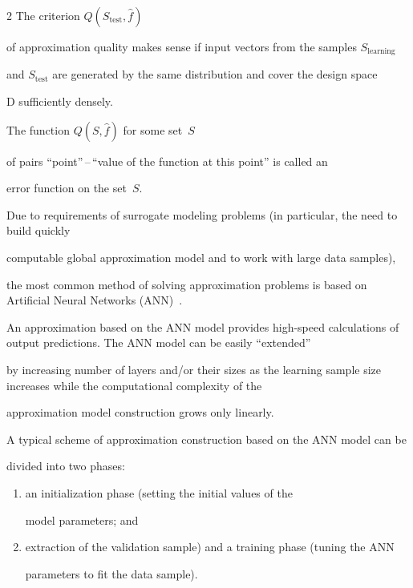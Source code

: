\begin{multicols}{2}
The criterion $Q\left( S_{\mathrm{test}}, \hat f \right)$ 

of approximation quality makes sense if input vectors from the samples $S_{\mathrm{learning}}$ 

and $S_{\mathrm{test}}$ are generated by the same distribution and cover the design space 

$\mathrm{D}$ sufficiently densely.

The function $Q\left( S, \hat f \right)$ for some set~$S$ 

of pairs ``point''\,--\,``value of the function at this point'' is called an 

error function on the set~$S$.



\medskip



Due to requirements of surrogate modeling problems (in particular, the need to build quickly 

computable global approximation model and to work with large data samples),

   the most common method of solving approximation problems is based on Artificial Neural Networks (ANN)~\cite{elementsOfStatLearning}. 

An approximation based on the ANN model provides high-speed calculations of output predictions. The ANN model can be easily ``extended'' 

by increasing number of layers and/or their sizes as the learning sample size increases while the computational complexity of the 

approximation model construction grows only linearly.



A typical scheme of approximation construction based on the ANN model can be 

divided into two phases:

\begin{enumerate}[(1)]

\item an initialization phase (setting the initial values of the 

model parameters;  and \\[-9pt]

\item extraction of the validation sample) and a training phase (tuning the ANN 

 parameters to fit the data sample).

 \end{enumerate}


\end{multicols}

